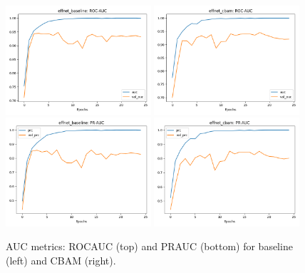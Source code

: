 \begin{figure}[t]
  \centering
  \includegraphics[width=0.48\textwidth]{../new_work/figures/effnet_baseline_auc.png}
  \includegraphics[width=0.48\textwidth]{../new_work/figures/effnet_cbam_auc.png}\\
  \includegraphics[width=0.48\textwidth]{../new_work/figures/effnet_baseline_prc.png}
  \includegraphics[width=0.48\textwidth]{../new_work/figures/effnet_cbam_prc.png}
  \caption{AUC metrics: ROC\textendash AUC (top) and PR\textendash AUC (bottom) for baseline (left) and CBAM (right).}
  \label{fig:auc_curves}
\end{figure}

